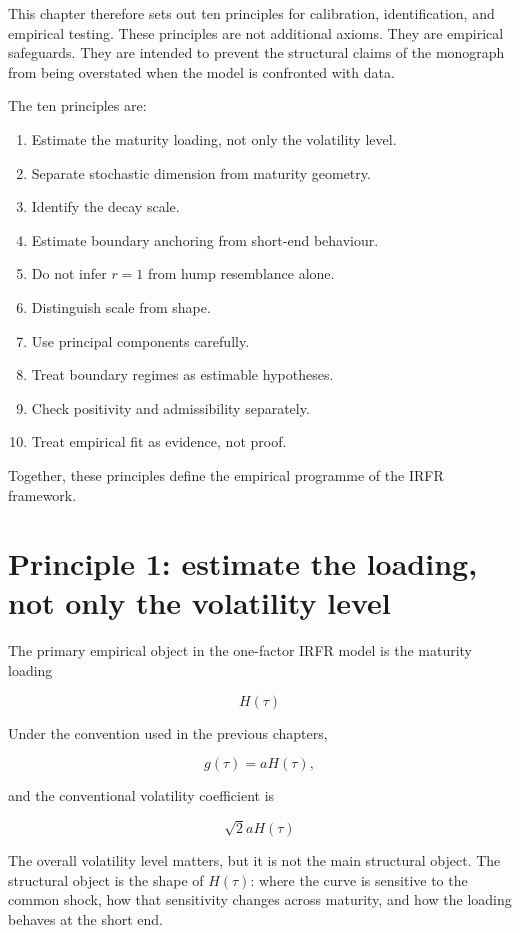 \documentclass[11pt,oneside]{book}
\begin{document}
This chapter therefore sets out ten principles for calibration,
identification, and empirical testing. These principles are not
additional axioms. They are empirical safeguards. They are intended to
prevent the structural claims of the monograph from being overstated
when the model is confronted with data.

The ten principles are:

\begin{enumerate}
\item Estimate the maturity loading, not only the volatility level.
\item Separate stochastic dimension from maturity geometry.
\item Identify the decay scale.
\item Estimate boundary anchoring from short-end behaviour.
\item Do not infer $r=1$ from hump resemblance alone.
\item Distinguish scale from shape.
\item Use principal components carefully.
\item Treat boundary regimes as estimable hypotheses.
\item Check positivity and admissibility separately.
\item Treat empirical fit as evidence, not proof.
\end{enumerate}

Together, these principles define the empirical programme of the IRFR
framework.

\section{Principle 1: estimate the loading, not only the volatility
level}\label{principle-1-estimate-the-loading-not-only-the-volatility-level}

The primary empirical object in the one-factor IRFR model is the
maturity loading

\[
H(\tau)
\]

Under the convention used in the previous chapters,

\[
g(\tau)=aH(\tau),
\]

and the conventional volatility coefficient is

\[
\sqrt{2} aH(\tau)
\]

The overall volatility level matters, but it is not the main structural
object. The structural object is the shape of $H(\tau)$: where the curve is
sensitive to the common shock, how that sensitivity changes across
maturity, and how the loading behaves at the short end.
\end{document}
